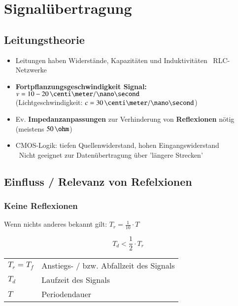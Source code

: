 \section{Signalübertragung}

\subsection{Leitungstheorie}

\begin{itemize}
    \item Leitungen haben Widerstände, Kapazitäten und Induktivitäten \textrightarrow\ RLC-Netzwerke
    \item \textbf{Fortpflanzungsgeschwindigkeit Signal:} $v = 10 - 20 \, \centi \meter / \nano \second$ \\
        (Lichtgeschwindigkeit: $c = 30 \, \centi \meter / \nano \second$)
    \item Ev. \textbf{Impedanzanpassungen} zur Verhinderung von \textbf{Reflexionen} nötig (meistens $50 \, \ohm$)
    \item CMOS-Logik: tiefen Quellenwiderstand, hohen Eingangswiderstand \\
        \textrightarrow\ Nicht geeignet zur Datenübertragung über 'längere Strecken'
\end{itemize}


\subsection{Einfluss / Relevanz von Refelxionen}

\subsubsection{Keine Reflexionen}

Wenn nichts anderes bekannt gilt: $T_r = \frac{1}{10} \cdot T$ 

\begin{minipage}[c]{0.3\columnwidth}
    $$ \boxed{ T_d < \frac{1}{2} \cdot T_r} $$
\end{minipage}
\hfill
\begin{minipage}[c]{0.68\columnwidth}
    \begin{tabular}{ll}
        $T_r = T_f$ & Anstiegs- / bzw. Abfallzeit des Signals \\
        $T_d$       & Laufzeit des Signals \\
        $T$         & Periodendauer
    \end{tabular}
\end{minipage}


